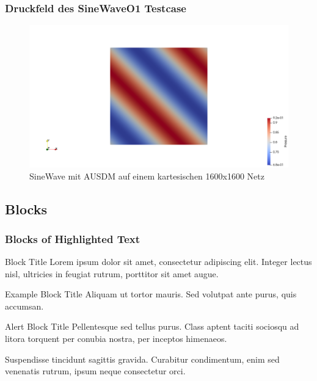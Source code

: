 \documentclass[
	11pt, %
	aspectratio=169, %
]{beamer}
\begin{document}
	\begin{frame}
	\frametitle{Druckfeld des SineWaveO1 Testcase}
	
	\begin{figure}
		\includegraphics[width=0.7\linewidth]{SineWaveO1AUSMD_1600x1600.png}
		\caption{SineWave mit AUSDM auf einem kartesischen 1600x1600 Netz}
	\end{figure}
	\end{frame}


\subsection{Blocks}

\begin{frame}
	\frametitle{Blocks of Highlighted Text}
	
	\begin{block}{Block Title}
		Lorem ipsum dolor sit amet, consectetur adipiscing elit. Integer lectus nisl, ultricies in feugiat rutrum, porttitor sit amet augue.
	\end{block}
	
	\begin{exampleblock}{Example Block Title}
		Aliquam ut tortor mauris. Sed volutpat ante purus, quis accumsan.
	\end{exampleblock}
	
	\begin{alertblock}{Alert Block Title}
		Pellentesque sed tellus purus. Class aptent taciti sociosqu ad litora torquent per conubia nostra, per inceptos himenaeos.
	\end{alertblock}
	
	\begin{block}{} %
		Suspendisse tincidunt sagittis gravida. Curabitur condimentum, enim sed venenatis rutrum, ipsum neque consectetur orci.
	\end{block}
\end{frame}
\end{document}
